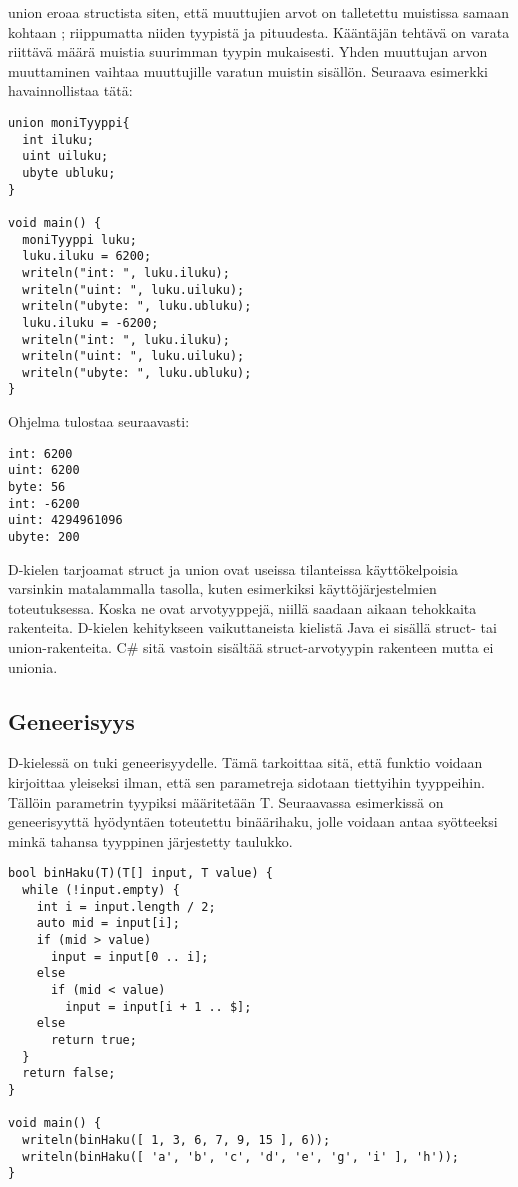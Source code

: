 \documentclass[11pt,oneside,a4paper]{article}
\begin{document}
union eroaa structista siten, että muuttujien arvot on talletettu muistissa
samaan kohtaan \cite{ALE10};\cite{KRR88} riippumatta niiden tyypistä ja
pituudesta. Kääntäjän tehtävä on varata riittävä määrä muistia suurimman tyypin
mukaisesti. Yhden muuttujan arvon muuttaminen vaihtaa muuttujille varatun
muistin sisällön. Seuraava esimerkki havainnollistaa tätä:
\begin{verbatim}
union moniTyyppi{
  int iluku;
  uint uiluku;
  ubyte ubluku;
}

void main() {
  moniTyyppi luku;
  luku.iluku = 6200;
  writeln("int: ", luku.iluku);
  writeln("uint: ", luku.uiluku);
  writeln("ubyte: ", luku.ubluku);
  luku.iluku = -6200;
  writeln("int: ", luku.iluku);
  writeln("uint: ", luku.uiluku);
  writeln("ubyte: ", luku.ubluku);
}
\end{verbatim}
Ohjelma tulostaa seuraavasti:

\begin{verbatim}
int: 6200
uint: 6200
byte: 56
int: -6200
uint: 4294961096
ubyte: 200
\end{verbatim}

D-kielen tarjoamat struct ja union ovat useissa tilanteissa käyttökelpoisia
varsinkin matalammalla tasolla, kuten esimerkiksi käyttöjärjestelmien
toteutuksessa. Koska ne ovat arvotyyppejä, niillä saadaan aikaan tehokkaita
rakenteita. D-kielen kehitykseen vaikuttaneista kielistä Java ei sisällä struct-
tai union-rakenteita. C\# sitä vastoin sisältää struct-arvotyypin rakenteen
mutta ei unionia.

\subsection{Geneerisyys}
D-kielessä on tuki geneerisyydelle. Tämä tarkoittaa sitä, että funktio voidaan
kirjoittaa yleiseksi ilman, että sen parametreja sidotaan tiettyihin tyyppeihin.
Tällöin parametrin tyypiksi määritetään T. Seuraavassa esimerkissä on
geneerisyyttä hyödyntäen toteutettu binäärihaku, jolle voidaan antaa syötteeksi
minkä tahansa tyyppinen järjestetty taulukko.

\begin{verbatim}
bool binHaku(T)(T[] input, T value) {
  while (!input.empty) {
    int i = input.length / 2;
    auto mid = input[i];
    if (mid > value)
      input = input[0 .. i];
    else 
      if (mid < value)
        input = input[i + 1 .. $];
    else 
      return true;
  }
  return false;
}

void main() {
  writeln(binHaku([ 1, 3, 6, 7, 9, 15 ], 6));
  writeln(binHaku([ 'a', 'b', 'c', 'd', 'e', 'g', 'i' ], 'h'));
}
\end{verbatim}
\end{document}
